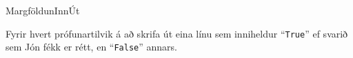 \begin{problem}{Margföldun}{Inn}{Út}{~}{~}
	\Output

		Fyrir hvert prófunartilvik á að skrifa út eina línu sem inniheldur "`\texttt{True}"' ef svarið sem Jón fékk er rétt, en "`\texttt{False}"' annars.

	\Examples

		\begin{example}
		\end{example}

\end{problem}